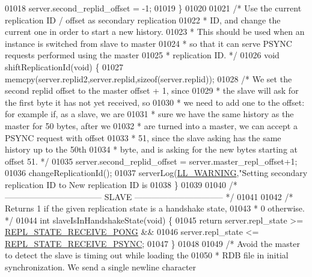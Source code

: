 \begin{DoxyCode}
{{{{{{{{{{{{{{{{{{{{{{{{{{{{{{{{{{{{{{{01018     server.second\_replid\_offset = -1;
01019 \}
01020 
01021 \textcolor{comment}{/* Use the current replication ID / offset as secondary replication}
01022 \textcolor{comment}{ * ID, and change the current one in order to start a new history.}
01023 \textcolor{comment}{ * This should be used when an instance is switched from slave to master}
01024 \textcolor{comment}{ * so that it can serve PSYNC requests performed using the master}
01025 \textcolor{comment}{ * replication ID. */}
01026 \textcolor{keywordtype}{void} shiftReplicationId(\textcolor{keywordtype}{void}) \{
01027     memcpy(server.replid2,server.replid,\textcolor{keyword}{sizeof}(server.replid));
01028     \textcolor{comment}{/* We set the second replid offset to the master offset + 1, since}
01029 \textcolor{comment}{     * the slave will ask for the first byte it has not yet received, so}
01030 \textcolor{comment}{     * we need to add one to the offset: for example if, as a slave, we are}
01031 \textcolor{comment}{     * sure we have the same history as the master for 50 bytes, after we}
01032 \textcolor{comment}{     * are turned into a master, we can accept a PSYNC request with offset}
01033 \textcolor{comment}{     * 51, since the slave asking has the same history up to the 50th}
01034 \textcolor{comment}{     * byte, and is asking for the new bytes starting at offset 51. */}
01035     server.second\_replid\_offset = server.master\_repl\_offset+1;
01036     changeReplicationId();
01037     serverLog(\hyperlink{server_8h_a31229b9334bba7d6be2a72970967a14b}{LL\_WARNING},\textcolor{stringliteral}{"Setting secondary replication ID to %
       New replication ID is %
01038 \}
01039 
01040 \textcolor{comment}{/* ----------------------------------- SLAVE -------------------------------- */}
01041 
01042 \textcolor{comment}{/* Returns 1 if the given replication state is a handshake state,}
01043 \textcolor{comment}{ * 0 otherwise. */}
01044 \textcolor{keywordtype}{int} slaveIsInHandshakeState(\textcolor{keywordtype}{void}) \{
01045     \textcolor{keywordflow}{return} server.repl\_state >= \hyperlink{server_8h_a61922e0fcf35df9722d2648484d23ff2}{REPL\_STATE\_RECEIVE\_PONG} &&
01046            server.repl\_state <= \hyperlink{server_8h_a31432ee96d5825316f1d96bcbda28d58}{REPL\_STATE\_RECEIVE\_PSYNC};
01047 \}
01048 
01049 \textcolor{comment}{/* Avoid the master to detect the slave is timing out while loading the}
01050 \textcolor{comment}{ * RDB file in initial synchronization. We send a single newline character}
}}}}}}}}}}}}}}}}}}}}}}}}}}}}}}}}}}}}}}}}
\end{DoxyCode}
